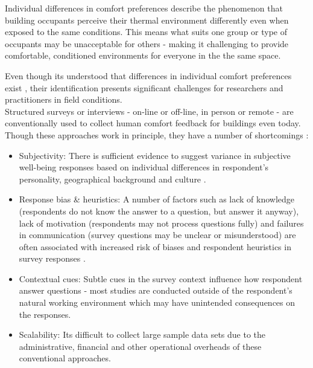 

Individual differences in comfort preferences describe the phenomenon that building occupants perceive their thermal environment differently even when exposed to the same conditions. This means what suits one group or type of occupants may be unacceptable for others - making it challenging to provide comfortable, conditioned environments for everyone in the the same space.

Even though its understood that differences in individual comfort preferences exist \cite{WANG2018181}, their identification presents significant challenges for researchers and practitioners in field conditions.\\

Structured surveys or interviews - on-line or off-line, in person or remote - are conventionally used to collect human comfort feedback for buildings even today. Though these approaches work in principle, they have a number of shortcomings \cite{organisationforeconomicco-operationanddevelopment(oecd)_2013}:  

\begin{itemize}
  \item Subjectivity: There is sufficient evidence to suggest variance in subjective well-being responses based on individual differences in respondent's personality, geographical background and culture \cite{doi:10.1146/annurev.psych.54.101601.145056}.
  \item Response bias \& heuristics: A number of factors such as lack of knowledge (respondents do not know the answer to a question, but answer it anyway), lack of motivation (respondents may not process questions fully) and failures in communication (survey questions may be unclear or misunderstood) are often associated with increased risk of biases and respondent heuristics in survey responses \cite{bradburn2004asking}.
  \item Contextual cues: Subtle cues in the survey context influence how respondent answer questions \cite{krosnick1997seymour} - most studies are conducted outside of the respondent's natural working environment which may have unintended consequences on the responses. 
  \item Scalability: Its difficult to collect large sample data sets due to the administrative, financial and other operational overheads of these conventional approaches.
\end{itemize}


